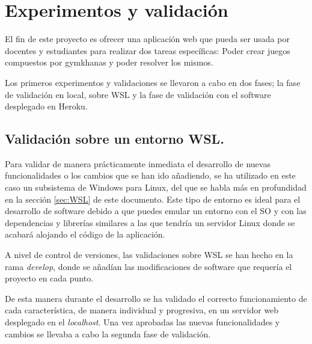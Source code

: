 \documentclass[a4paper, 12pt]{book}
\begin{document}

\cleardoublepage


\chapter{Experimentos y validación}

 

El fin de este proyecto es ofrecer una aplicación web que pueda ser usada por docentes y estudiantes para realizar dos tareas específicas: Poder crear juegos compuestos por gymkhanas y poder resolver los mismos.

Los primeros experimentos y validaciones se llevaron a cabo en dos fases; la fase de validación en local, sobre WSL y la fase de validación con el software desplegado en Heroku.


\section{Validación sobre un entorno WSL.}

Para validar de manera prácticamente inmediata el desarrollo de nuevas funcionalidades o los cambios que se han ido añadiendo, se ha utilizado en este caso un subsistema de Windows para Linux, del que se habla más en profundidad en la sección \ref{sec:WSL} de este documento. Este tipo de entorno es ideal para el desarrollo de software debido a que puedes emular un entorno con el SO y con las dependencias y librerías similares a las que tendría un servidor Linux donde se acabará alojando el código de la aplicación. 

A nivel de control de versiones, las validaciones sobre WSL se han hecho en la rama \emph{develop}, donde se añadían las modificaciones de software que requería el proyecto en cada punto. 

De esta manera durante el desarrollo se ha validado el correcto funcionamiento de cada característica, de manera individual y progresiva, en un servidor web desplegado en el \emph{localhost}. Una vez aprobadas las nuevas funcionalidades y cambios se llevaba a cabo la segunda fase de validación. 
	
\end{document}
